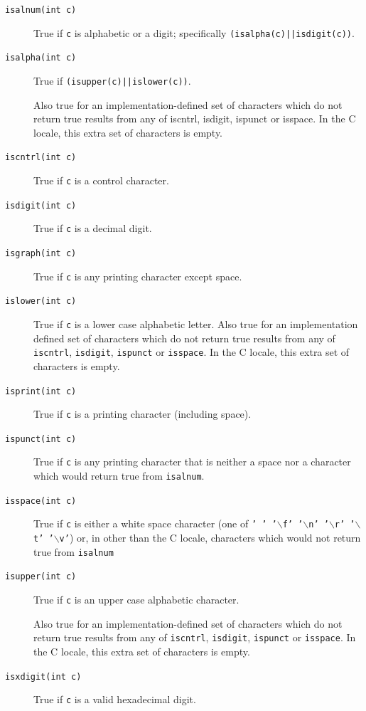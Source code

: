   \begin{description}
   \item[\texttt{isalnum(int c)}] True if \texttt{c} is alphabetic or a digit; specifically
   \texttt{(isalpha(c)||isdigit(c))}.

   \item[\texttt{isalpha(int c)}] 
    True if \texttt{(isupper(c)||islower(c))}.


    Also true for an implementation-defined set of characters
     which do not return true results from any of iscntrl,
     isdigit, ispunct or isspace.  In the C locale, this extra
     set of characters is empty.

   

   \item[\texttt{iscntrl(int c)}] True if \texttt{c} is a control character.

   \item[\texttt{isdigit(int c)}] True if \texttt{c} is a decimal digit.

   \item[\texttt{isgraph(int c)}] True if \texttt{c} is any printing character except space.

   \item[\texttt{islower(int c)}] True if \texttt{c} is a lower case alphabetic letter.
    Also true for an implementation defined set of characters
    which do not return true results from any of \texttt{iscntrl},
    \texttt{isdigit}, \texttt{ispunct} or \texttt{isspace}.
    In the C locale, this extra set of characters is empty.

   \item[\texttt{isprint(int c)}] True if \texttt{c} is a printing character (including space).

   \item[\texttt{ispunct(int c)}] True if \texttt{c} is any printing character that is neither a
    space nor a character which would return true from
    \texttt{isalnum}.

   \item[\texttt{isspace(int c)}] True if \texttt{c} is either a white space character (one of
    \texttt{' ' '$\backslash$f'  '$\backslash$n'  '$\backslash$r'  '$\backslash$t'  '$\backslash$v'}) or, in other than the
    C locale, characters which would not return true from
    \texttt{isalnum}

   \item[\texttt{isupper(int c)}] 
    True if \texttt{c} is an upper case alphabetic character.


    Also true for an implementation-defined set of characters
     which do not return true results from any of \texttt{iscntrl},
     \texttt{isdigit}, \texttt{ispunct} or \texttt{isspace}.
     In the C locale, this extra set of characters is empty.

   

   \item[\texttt{isxdigit(int c)}] True if \texttt{c} is a valid hexadecimal digit.
  \end{description}

